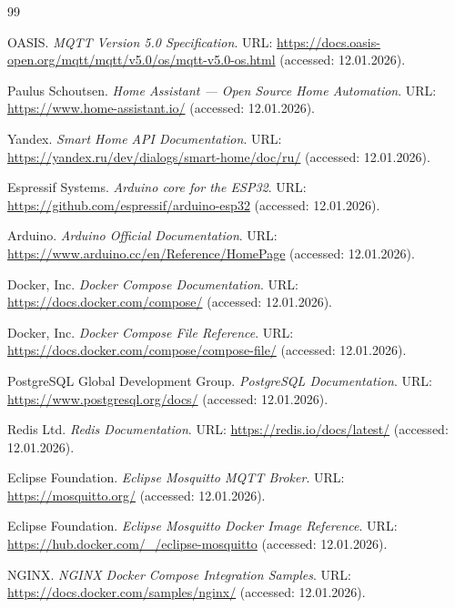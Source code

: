 \documentclass[a4paper,12pt]{article}
\begin{document}
\begin{thebibliography}{99}

OASIS. \textit{MQTT Version 5.0 Specification}. URL: \url{https://docs.oasis-open.org/mqtt/mqtt/v5.0/os/mqtt-v5.0-os.html} (accessed: 12.01.2026).

Paulus Schoutsen. \textit{Home Assistant --- Open Source Home Automation}. URL: \url{https://www.home-assistant.io/} (accessed: 12.01.2026).

Yandex. \textit{Smart Home API Documentation}. URL: \url{https://yandex.ru/dev/dialogs/smart-home/doc/ru/} (accessed: 12.01.2026).

Espressif Systems. \textit{Arduino core for the ESP32}. URL: \url{https://github.com/espressif/arduino-esp32} (accessed: 12.01.2026).

Arduino. \textit{Arduino Official Documentation}. URL: \url{https://www.arduino.cc/en/Reference/HomePage} (accessed: 12.01.2026).

Docker, Inc. \textit{Docker Compose Documentation}. URL: \url{https://docs.docker.com/compose/} (accessed: 12.01.2026).

Docker, Inc. \textit{Docker Compose File Reference}. URL: \url{https://docs.docker.com/compose/compose-file/} (accessed: 12.01.2026).

PostgreSQL Global Development Group. \textit{PostgreSQL Documentation}. URL: \url{https://www.postgresql.org/docs/} (accessed: 12.01.2026).

Redis Ltd. \textit{Redis Documentation}. URL: \url{https://redis.io/docs/latest/} (accessed: 12.01.2026).

Eclipse Foundation. \textit{Eclipse Mosquitto MQTT Broker}. URL: \url{https://mosquitto.org/} (accessed: 12.01.2026).

Eclipse Foundation. \textit{Eclipse Mosquitto Docker Image Reference}. URL: \url{https://hub.docker.com/_/eclipse-mosquitto} (accessed: 12.01.2026).

NGINX. \textit{NGINX Docker Compose Integration Samples}. URL: \url{https://docs.docker.com/samples/nginx/} (accessed: 12.01.2026).


\end{thebibliography}
\end{document}

